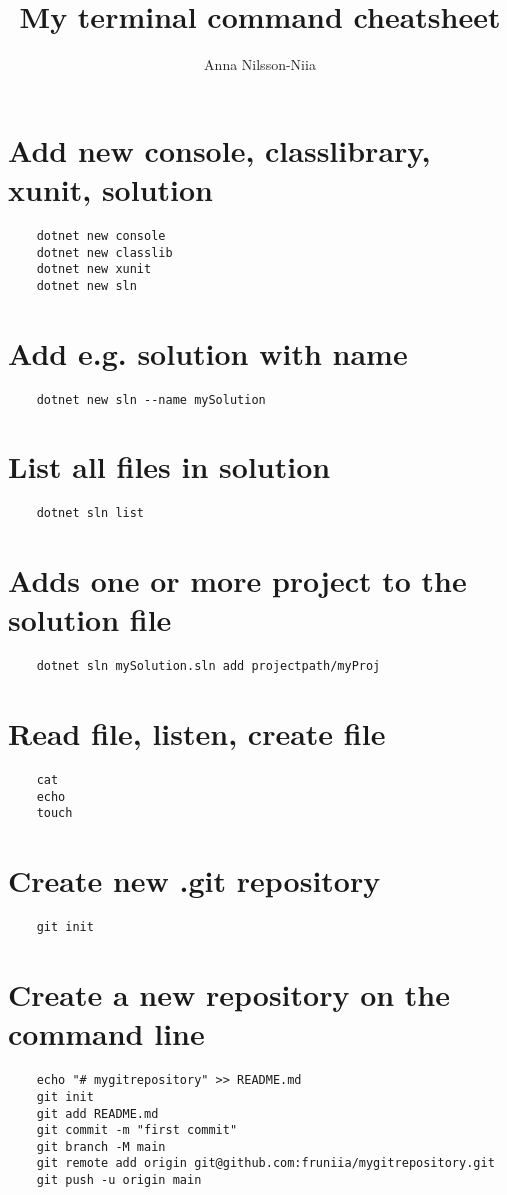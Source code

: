 \documentclass[10pt, a4paper]{article}
\title{My terminal command cheatsheet}
\author{Anna Nilsson-Niia}
\begin{document}
\maketitle
\section*{Add new console, classlibrary, xunit, solution}
\begin{verbatim}
    dotnet new console
    dotnet new classlib
    dotnet new xunit
    dotnet new sln
\end{verbatim}
\section*{Add e.g. solution with name}
\begin{verbatim}
    dotnet new sln --name mySolution
\end{verbatim}
\section*{List all files in solution}
\begin{verbatim}
    dotnet sln list
\end{verbatim}
\section*{Adds one or more project to the solution file}
\begin{verbatim}
    dotnet sln mySolution.sln add projectpath/myProj
\end{verbatim}
\section*{Read file, listen, create file}
\begin{verbatim}
    cat 
    echo 
    touch
\end{verbatim}
\section*{Create new .git repository}
\begin{verbatim}
    git init
\end{verbatim}
\section*{Create a new repository on the command line}
\begin{verbatim}
    echo "# mygitrepository" >> README.md
    git init
    git add README.md
    git commit -m "first commit"
    git branch -M main
    git remote add origin git@github.com:fruniia/mygitrepository.git
    git push -u origin main
\end{verbatim}
\end{document}
